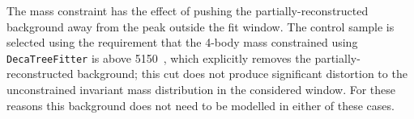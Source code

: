The \jpsi mass constraint has the effect of pushing the partially-reconstructed background away from 
the peak outside the fit window. The \jpsi control sample is selected using the requirement that the 4-body 
mass constrained using \verb!DecaTreeFitter! is above 5150~\mevc, which explicitly removes
the partially-reconstructed background; this cut does not produce significant distortion to the
unconstrained invariant mass distribution in the considered window. 
For these reasons this background does not need to be modelled in either of these cases.
%
%
%
%
%
%
%
%
